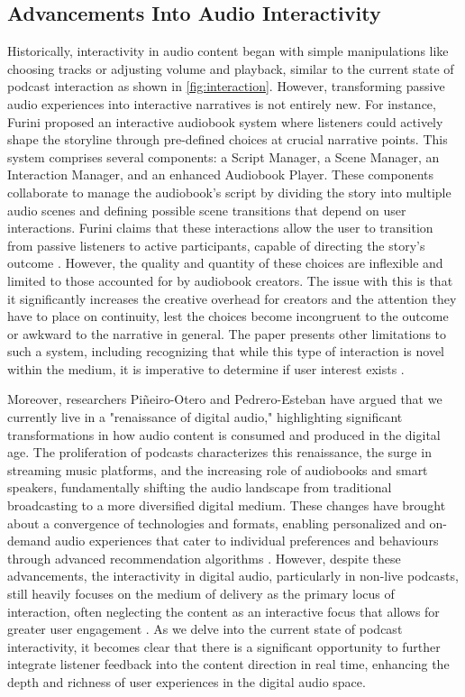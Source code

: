 \documentclass[12pt]{report}
\begin{document}
\begin{myfont}
        \section{Advancements Into Audio Interactivity}
        \indent Historically, interactivity in audio content began with simple manipulations like choosing tracks or adjusting volume and playback, similar to the current state of podcast interaction as shown in \ref{fig:interaction}. However, transforming passive audio experiences into interactive narratives is not entirely new. For instance, Furini \citep{Furini2007Beyond} proposed an interactive audiobook system where listeners could actively shape the storyline through pre-defined choices at crucial narrative points. This system comprises several components: a Script Manager, a Scene Manager, an Interaction Manager, and an enhanced Audiobook Player. These components collaborate to manage the audiobook's script by dividing the story into multiple audio scenes and defining possible scene transitions that depend on user interactions. Furini claims that these interactions allow the user to transition from passive listeners to active participants, capable of directing the story's outcome \citep{Furini2007Beyond}. However, the quality and quantity of these choices are inflexible and limited to those accounted for by audiobook creators. The issue with this is that it significantly increases the creative overhead for creators and the attention they have to place on continuity, lest the choices become incongruent to the outcome or awkward to the narrative in general. The paper presents other limitations to such a system, including recognizing that while this type of interaction is novel within the medium, it is imperative to determine if user interest exists \citep{Furini2007Beyond}.
        
        \indent Moreover, researchers Piñeiro-Otero and Pedrero-Esteban \citep{Piñeiro-Otero2022Audio} have argued that we currently live in a "renaissance of digital audio," highlighting significant transformations in how audio content is consumed and produced in the digital age. The proliferation of podcasts characterizes this renaissance, the surge in streaming music platforms, and the increasing role of audiobooks and smart speakers, fundamentally shifting the audio landscape from traditional broadcasting to a more diversified digital medium. These changes have brought about a convergence of technologies and formats, enabling personalized and on-demand audio experiences that cater to individual preferences and behaviours through advanced recommendation algorithms \citep{Piñeiro-Otero2022Audio}. However, despite these advancements, the interactivity in digital audio, particularly in non-live podcasts, still heavily focuses on the medium of delivery as the primary locus of interaction, often neglecting the content as an interactive focus that allows for greater user engagement \citep{Sundar2010Designing}. As we delve into the current state of podcast interactivity, it becomes clear that there is a significant opportunity to further integrate listener feedback into the content direction in real time, enhancing the depth and richness of user experiences in the digital audio space.
        

\end{myfont}
\end{document}
